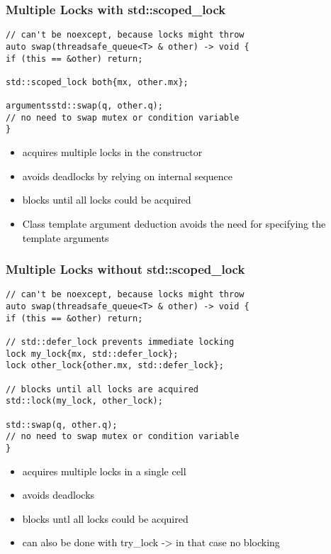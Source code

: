 \documentclass[main.tex,fontsize=8pt,paper=a4,paper=portrait,DIV=calc,]{scrartcl}
\begin{document}
\subsubsection{Multiple Locks with std::scoped\_lock}
\begin{lstlisting}
// can't be noexcept, because locks might throw
auto swap(threadsafe_queue<T> & other) -> void {
if (this == &other) return;

std::scoped_lock both{mx, other.mx};

argumentsstd::swap(q, other.q);
// no need to swap mutex or condition variable
}
\end{lstlisting}
\begin{itemize}
\item \textcolor{black}{acquires multiple locks in the constructor}
\item \textcolor{black}{avoids deadlocks by relying on internal sequence}
\item \textcolor{black}{blocks until all locks could be acquired}
\item \textcolor{black}{Class template argument deduction avoids the need for specifying the template arguments}
\end{itemize} 

\subsubsection{Multiple Locks without std::scoped\_lock}
\begin{lstlisting}
// can't be noexcept, because locks might throw
auto swap(threadsafe_queue<T> & other) -> void {
if (this == &other) return;

// std::defer_lock prevents immediate locking
lock my_lock{mx, std::defer_lock};
lock other_lock{other.mx, std::defer_lock};

// blocks until all locks are acquired
std::lock(my_lock, other_lock);

std::swap(q, other.q);
// no need to swap mutex or condition variable
}
\end{lstlisting}
\begin{itemize}
\item \textcolor{black}{acquires multiple locks in a single cell}
\item \textcolor{black}{avoids deadlocks}
\item \textcolor{black}{blocks untl all locks could be acquired}
\item \textcolor{black}{can also be done with try\_lock -> in that case no blocking}
\end{itemize} 
\end{document}
